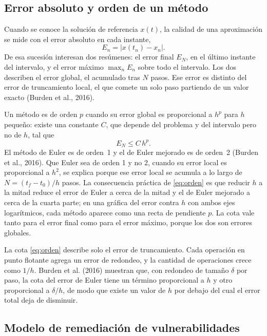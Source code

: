 \subsection{Error absoluto y orden de un método}
\label{subsec:error-orden}

Cuando se conoce la solución de referencia $x(t)$, la calidad de una aproximación se mide con el
error absoluto en cada instante,
\begin{equation}
  E_n = \lvert x(t_n) - x_n \rvert .
  \label{eq:error-absoluto}
\end{equation}
De esa sucesión interesan dos resúmenes: el error final $E_N$, en el último instante del
intervalo, y el error máximo $\max_n E_n$ sobre todo el intervalo. Los dos describen el error
global, el acumulado tras $N$ pasos. Ese error es distinto del error de truncamiento local, el
que comete un solo paso partiendo de un valor exacto (Burden et al., 2016).

Un método es de orden $p$ cuando su error global es proporcional a $h^p$ para $h$ pequeño:
existe una constante $C$, que depende del problema y del intervalo pero no de $h$, tal que
\begin{equation}
  E_N \le C\, h^{p} .
  \label{eq:orden}
\end{equation}
El método de Euler es de orden~1 y el de Euler mejorado es de orden~2 (Burden et al., 2016).
Que Euler sea de orden 1 y no 2, cuando su error local es proporcional a $h^2$, se explica
porque ese error local se acumula a lo largo de $N = (t_f - t_0)/h$ pasos. La consecuencia
práctica de \eqref{eq:orden} es que reducir $h$ a la mitad reduce el error de Euler a cerca de
la mitad y el de Euler mejorado a cerca de la cuarta parte; en una gráfica del error contra $h$ con ambos ejes
logarítmicos, cada método aparece como una recta de pendiente $p$. La cota vale tanto para el
error final como para el error máximo, porque los dos son errores globales.

La cota \eqref{eq:orden} describe solo el error de truncamiento. Cada operación en punto
flotante agrega un error de redondeo, y la cantidad de operaciones crece como $1/h$. Burden et
al. (2016) muestran que, con redondeo de tamaño $\delta$ por paso, la cota del error de Euler
tiene un término proporcional a $h$ y otro proporcional a $\delta/h$, de modo que existe un valor
de $h$ por debajo del cual el error total deja de disminuir.

\subsection{Modelo de remediación de vulnerabilidades}
\label{subsec:modelo-remediacion}

